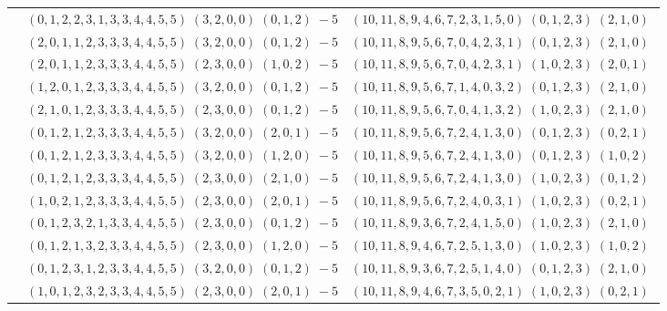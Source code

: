 \documentclass[11pt]{article}
\begin{document}
\begin{longtable}[l]{|c|c|c|}
 \cline{2-3} 
 & $(0 ,1 ,2 ,2 ,3 ,1 ,3 ,3 ,4 ,4 ,5 ,5) \;(3 ,2 ,0 ,0) \;(0 ,1 ,2) \;-5$ & $(10 ,11 ,8 ,9 ,4 ,6 ,7 ,2 ,3 ,1 ,5 ,0) \;(0 ,1 ,2 ,3) \;(2 ,1 ,0) \;$\\ 
 \cline{2-3} 
 & $(2 ,0 ,1 ,1 ,2 ,3 ,3 ,3 ,4 ,4 ,5 ,5) \;(3 ,2 ,0 ,0) \;(0 ,1 ,2) \;-5$ & $(10 ,11 ,8 ,9 ,5 ,6 ,7 ,0 ,4 ,2 ,3 ,1) \;(0 ,1 ,2 ,3) \;(2 ,1 ,0) \;$\\ 
 \cline{2-3} 
 & $(2 ,0 ,1 ,1 ,2 ,3 ,3 ,3 ,4 ,4 ,5 ,5) \;(2 ,3 ,0 ,0) \;(1 ,0 ,2) \;-5$ & $(10 ,11 ,8 ,9 ,5 ,6 ,7 ,0 ,4 ,2 ,3 ,1) \;(1 ,0 ,2 ,3) \;(2 ,0 ,1) \;$\\ 
 \cline{2-3} 
 & $(1 ,2 ,0 ,1 ,2 ,3 ,3 ,3 ,4 ,4 ,5 ,5) \;(3 ,2 ,0 ,0) \;(0 ,1 ,2) \;-5$ & $(10 ,11 ,8 ,9 ,5 ,6 ,7 ,1 ,4 ,0 ,3 ,2) \;(0 ,1 ,2 ,3) \;(2 ,1 ,0) \;$\\ 
 \cline{2-3} 
 & $(2 ,1 ,0 ,1 ,2 ,3 ,3 ,3 ,4 ,4 ,5 ,5) \;(2 ,3 ,0 ,0) \;(0 ,1 ,2) \;-5$ & $(10 ,11 ,8 ,9 ,5 ,6 ,7 ,0 ,4 ,1 ,3 ,2) \;(1 ,0 ,2 ,3) \;(2 ,1 ,0) \;$\\ 
 \cline{2-3} 
 & $(0 ,1 ,2 ,1 ,2 ,3 ,3 ,3 ,4 ,4 ,5 ,5) \;(3 ,2 ,0 ,0) \;(2 ,0 ,1) \;-5$ & $(10 ,11 ,8 ,9 ,5 ,6 ,7 ,2 ,4 ,1 ,3 ,0) \;(0 ,1 ,2 ,3) \;(0 ,2 ,1) \;$\\ 
 \cline{2-3} 
 & $(0 ,1 ,2 ,1 ,2 ,3 ,3 ,3 ,4 ,4 ,5 ,5) \;(3 ,2 ,0 ,0) \;(1 ,2 ,0) \;-5$ & $(10 ,11 ,8 ,9 ,5 ,6 ,7 ,2 ,4 ,1 ,3 ,0) \;(0 ,1 ,2 ,3) \;(1 ,0 ,2) \;$\\ 
 \cline{2-3} 
 & $(0 ,1 ,2 ,1 ,2 ,3 ,3 ,3 ,4 ,4 ,5 ,5) \;(2 ,3 ,0 ,0) \;(2 ,1 ,0) \;-5$ & $(10 ,11 ,8 ,9 ,5 ,6 ,7 ,2 ,4 ,1 ,3 ,0) \;(1 ,0 ,2 ,3) \;(0 ,1 ,2) \;$\\ 
 \cline{2-3} 
 & $(1 ,0 ,2 ,1 ,2 ,3 ,3 ,3 ,4 ,4 ,5 ,5) \;(2 ,3 ,0 ,0) \;(2 ,0 ,1) \;-5$ & $(10 ,11 ,8 ,9 ,5 ,6 ,7 ,2 ,4 ,0 ,3 ,1) \;(1 ,0 ,2 ,3) \;(0 ,2 ,1) \;$\\ 
 \cline{2-3} 
 & $(0 ,1 ,2 ,3 ,2 ,1 ,3 ,3 ,4 ,4 ,5 ,5) \;(2 ,3 ,0 ,0) \;(0 ,1 ,2) \;-5$ & $(10 ,11 ,8 ,9 ,3 ,6 ,7 ,2 ,4 ,1 ,5 ,0) \;(1 ,0 ,2 ,3) \;(2 ,1 ,0) \;$\\ 
 \cline{2-3} 
 & $(0 ,1 ,2 ,1 ,3 ,2 ,3 ,3 ,4 ,4 ,5 ,5) \;(2 ,3 ,0 ,0) \;(1 ,2 ,0) \;-5$ & $(10 ,11 ,8 ,9 ,4 ,6 ,7 ,2 ,5 ,1 ,3 ,0) \;(1 ,0 ,2 ,3) \;(1 ,0 ,2) \;$\\ 
 \cline{2-3} 
 & $(0 ,1 ,2 ,3 ,1 ,2 ,3 ,3 ,4 ,4 ,5 ,5) \;(3 ,2 ,0 ,0) \;(0 ,1 ,2) \;-5$ & $(10 ,11 ,8 ,9 ,3 ,6 ,7 ,2 ,5 ,1 ,4 ,0) \;(0 ,1 ,2 ,3) \;(2 ,1 ,0) \;$\\ 
 \cline{2-3} 
 & $(1 ,0 ,1 ,2 ,3 ,2 ,3 ,3 ,4 ,4 ,5 ,5) \;(2 ,3 ,0 ,0) \;(2 ,0 ,1) \;-5$ & $(10 ,11 ,8 ,9 ,4 ,6 ,7 ,3 ,5 ,0 ,2 ,1) \;(1 ,0 ,2 ,3) \;(0 ,2 ,1) \;$\\ 

\end{longtable}
\end{document}
